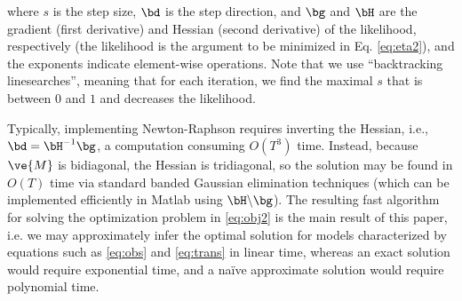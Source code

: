 \noindent where $s$ is the step size, $\bd$ is the step direction, and $\bg$ and $\bH$ are the gradient (first derivative) and Hessian (second derivative) of the likelihood, respectively (the likelihood is the argument to be minimized in Eq. \eqref{eq:eta2}), and the exponents indicate element-wise operations. Note that we use ``backtracking linesearches'', meaning that for each iteration, we find the maximal $s$ that is between $0$ and $1$ and decreases the likelihood.

Typically, implementing Newton-Raphson requires inverting the Hessian, i.e., $\bd = \bH^{-1} \bg$, a computation consuming $O(T^3)$ time. Instead, because $\ve{M}$ is bidiagonal, the Hessian is tridiagonal, so the solution may be found in $O(T)$ time via standard banded Gaussian elimination techniques (which can be implemented efficiently in Matlab using $\bH \backslash \bg$). The resulting fast algorithm for solving the optimization problem in \eqref{eq:obj2} is the main result of this paper, i.e.  we may approximately infer the optimal solution  for models characterized by equations such as \eqref{eq:obs} and \eqref{eq:trans} in linear time, whereas an exact solution would require exponential time, and a na\"{i}ve approximate solution would require polynomial time.  


